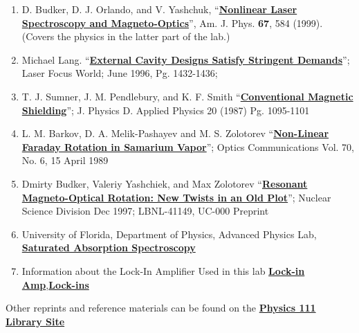 \documentclass{../lab}
\begin{document}
\begin{enumerate}
    \item D. Budker, D. J. Orlando, and V. Yashchuk, ``\href{http://physics111.lib.berkeley.edu/Physics111/Reprints/MNO/01-Nonlinear_Laser_Spectroscopy.pdf}{\textbf{Nonlinear Laser Spectroscopy and Magneto-Optics}}'', Am. J. Phys. \textbf{67}, 584 (1999). (Covers the physics in the latter part of the lab.)

    \item Michael Lang. ``\href{http://physics111.lib.berkeley.edu/Physics111/Reprints/MNO/05-External\_Cavity\_Designs.pdf}{\textbf{External Cavity Designs Satisfy Stringent Demands}}''; Laser Focus World; June 1996, Pg. 1432-1436;

    \item T. J. Sumner, J. M. Pendlebury, and K. F. Smith ``\href{http://physics111.lib.berkeley.edu/Physics111/Reprints/MNO/06-Conventional\_Magnetic\_Shielding.pdf}{\textbf{Conventional Magnetic Shielding}}''; J. Physics D. Applied Physics 20 (1987) Pg. 1095-1101

    \item L. M. Barkov, D. A. Melik-Pashayev and M. S. Zolotorev ``\href{http://physics111.lib.berkeley.edu/Physics111/Reprints/MNO/08-Nonlinear\_Faraday\_Rotation.pdf}{\textbf{Non-Linear Faraday Rotation in Samarium Vapor}}''; Optics Communications Vol. 70, No. 6, 15 April 1989

    \item Dmirty Budker, Valeriy Yashchiek, and Max Zolotorev ``\href{http://physics111.lib.berkeley.edu/Physics111/Reprints/MNO/09-Resonant\_Magneto-Optical\_Rotation.pdf}{\textbf{Resonant Magneto-Optical Rotation: New Twists in an Old Plot}}''; Nuclear Science Division Dec 1997; LBNL-41149, UC-000 Preprint

    \item University of Florida, Department of Physics, Advanced Physics Lab, \href{http://experimentationlab.berkeley.edu/sites/default/files/SaturatedAbsorptionSpectroscopy.pdf}{\textbf{Saturated Absorption Spectroscopy}}

    \item Information about the Lock-In Amplifier Used in this lab \href{http://physics111.lib.berkeley.edu/Physics111/Reprints/NMR/Lock-in-Amp.pdf}{\textbf{Lock-in Amp}},\href{http://physics111.lib.berkeley.edu/Physics111/Reprints/NMR/About-Lock-Ins.pdf}{\textbf{Lock-ins}}

\end{enumerate}

\noindent Other reprints and reference materials can be found on the \href{http://physics111.lib.berkeley.edu/Physics111/Reprints/MNO/MNO\_index.html}{\textbf{Physics 111 Library Site}}
\end{document}
